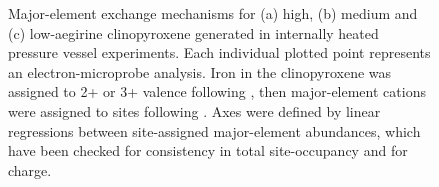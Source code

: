 \documentclass[review,authoryear,12pt]{elsarticle}
\begin{document}
\begin{figure}[htpb]
\begin{center}
\begin{minipage}[c]{.47\linewidth}
\end{minipage}\hfill
\begin{minipage}[c]{0.47\textwidth}
\caption[Major-element exchange mechanisms]{Major-element exchange mechanisms for (a) high, (b) medium and (c) low-aegirine clinopyroxene generated in internally heated pressure vessel experiments. Each individual plotted point represents an electron-microprobe analysis. Iron in the clinopyroxene was assigned to 2+ or 3+ valence following \citet{Droop1987}, then major-element cations were assigned to sites following \citet[][see supplement \ref{EXCEL_D_Model}]{Morimoto1989}. Axes were defined by linear regressions between site-assigned major-element abundances, which have been checked for consistency in total site-occupancy and for charge.}
\label{SF_ExchMech}
\end{minipage}
\end{center}
\end{figure}
\end{document}
